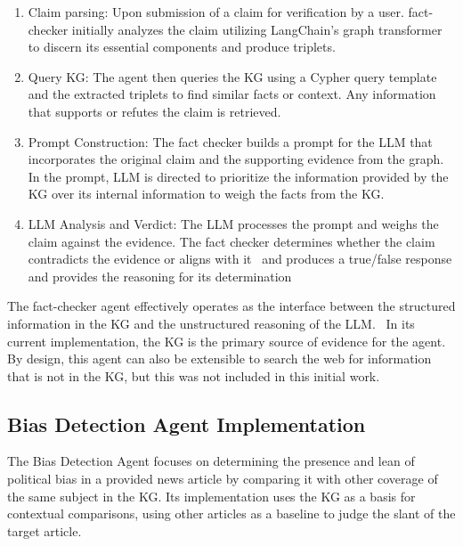 \documentclass{scrartcl}
\begin{document}
\begin{enumerate}

    \item Claim parsing: Upon submission of a claim for verification by a user. fact-checker initially analyzes the claim utilizing LangChain’s graph transformer to discern its essential components and produce triplets.
    
    \item Query KG: The agent then queries the KG using a Cypher query template and the extracted triplets to find similar facts or context. Any information that supports or refutes the claim is retrieved.
    
    \item Prompt Construction: The fact checker builds a prompt for the LLM that incorporates the original claim and the supporting evidence from the graph. In the prompt, LLM is directed to prioritize the information provided by the KG over its internal information to weigh the facts from the KG.
    
    \item LLM Analysis and Verdict: The LLM processes the prompt and weighs the claim against the evidence. The fact checker determines whether the claim contradicts the evidence or aligns with it  and produces a true/false response and provides the reasoning for its determination
 

\end{enumerate}

The fact-checker agent effectively operates as the interface between the structured information in the KG and the unstructured reasoning of the LLM.  In its current implementation, the KG is the primary source of evidence for the agent. By design, this agent can also be extensible to search the web for information that is not in the KG, but this was not included in this initial work. 

\subsection{Bias Detection Agent Implementation}
The Bias Detection Agent focuses on determining the presence and lean of political bias in a provided news article by comparing it with other coverage of the same subject in the KG. Its implementation uses the KG as a basis for contextual comparisons, using other articles as a baseline to judge the slant of the target article.
\end{document}

